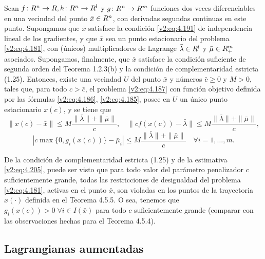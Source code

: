 \begin{theorem}\label{v2:thm:4.5.5}
    Sean $f \colon R^n \to R, h \colon R^n \to R^l$ y $g \colon R^n \to R^m$ funciones dos veces diferenciables en una vecindad del punto $\bar{x} \in R^n$, con derivadas segundas continuas en este punto. Supongamos que $\bar{x}$ satisface la condición \eqref{v2:eq:4.191} de independencia lineal de los gradientes, y que $\bar{x}$ sea un punto estacionario del problema \eqref{v2:eq:4.181}, con (únicos) multiplicadores de Lagrange $\bar{\lambda} \in R^l$ y $\bar{\mu} \in R^m_+$ asociados. Supongamos, finalmente, que $\bar{x}$ satisface la condición suficiente de segunda orden del Teorema 1.2.3(b) y la condición de complementaridad estricta (1.25).
    Entonces, existe una vecindad $U$ del punto $\bar{x}$ y números $\bar{c} \ge 0$ y $M > 0$, tales que, para todo $c > \bar{c}$, el problema \eqref{v2:eq:4.187} con función objetivo definida por las fórmulas \eqref{v2:eq:4.186}, \eqref{v2:eq:4.185}, posee en $U$ un único punto estacionario $x(c)$, y se tiene que
    \begin{equation}
        \|x(c) - \bar{x}\| \le M\frac{\|\bar{\lambda}\| + \|\bar{\mu}\|}{c}, \quad \|c f(x(c)) - \bar{\lambda}\| \le M\frac{\|\bar{\lambda}\| + \|\bar{\mu}\|}{c},
    \end{equation}
    \begin{equation}
        |c\max\{0, g_i(x(c))\} - \bar{\mu}_i| \le M\frac{\|\bar{\lambda}\| + \|\bar{\mu}\|}{c} \quad \forall i = 1, \dots, m.
        \label{v2:eq:4.205}
    \end{equation}
\end{theorem}


De la condición de complementaridad estricta (1.25) y de la estimativa \eqref{v2:eq:4.205}, puede ser visto que para todo valor del parámetro penalizador $c$ suficientemente grande, todas las restricciones de desigualdad del problema \eqref{v2:eq:4.181}, activas en el punto $\bar{x}$, son violadas en los puntos de la trayectoria $x(\cdot)$ definida en el Teorema 4.5.5. O sea, tenemos que $g_i(x(c)) > 0 \; \forall i \in I(\bar{x})$ para todo $c$ suficientemente grande (comparar con las observaciones hechas para el Teorema 4.5.4).

\subsection{Lagrangianas aumentadas}\label{v2:sec:4.5.4}

